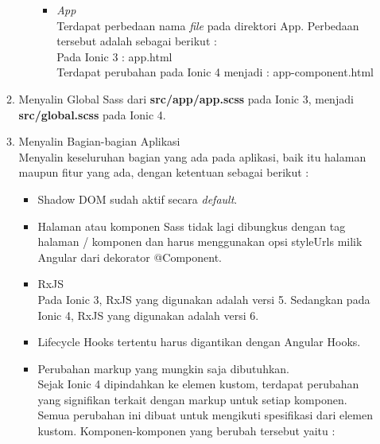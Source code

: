 \begin{enumerate}
\begin{enumerate}
\begin{itemize}
\begin{itemize}
				\item {\it App} \\
				Terdapat perbedaan nama {\it file} pada direktori App. Perbedaan tersebut adalah sebagai berikut : \\
				Pada Ionic 3 : app.html \\
				Terdapat perubahan pada Ionic 4 menjadi : app-component.html
			\end{itemize}



			
		\end{itemize}
		

		\item Menyalin Global Sass dari \textbf{src/app/app.scss} pada Ionic 3, menjadi \textbf{src/global.scss} pada Ionic 4.

		\item Menyalin Bagian-bagian Aplikasi \\
		Menyalin keseluruhan bagian yang ada pada aplikasi, baik itu halaman maupun fitur yang ada, dengan ketentuan sebagai berikut :

		\begin{itemize}
			\item Shadow DOM sudah aktif secara {\it default}.
			\item Halaman atau komponen Sass tidak lagi dibungkus dengan tag halaman / komponen dan harus menggunakan opsi styleUrls milik Angular dari dekorator @Component.
			\item RxJS \\
			Pada Ionic 3, RxJS yang digunakan adalah versi 5. Sedangkan pada Ionic 4, RxJS yang digunakan adalah versi 6.

			\item Lifecycle Hooks tertentu harus digantikan dengan Angular Hooks.
			\item Perubahan markup yang mungkin saja dibutuhkan. \\
			Sejak Ionic 4 dipindahkan ke elemen kustom, terdapat perubahan yang signifikan terkait dengan markup untuk setiap komponen. Semua perubahan ini dibuat untuk mengikuti spesifikasi dari elemen kustom. Komponen-komponen yang berubah tersebut yaitu :


\end{itemize}
\end{enumerate}
\end{enumerate}
